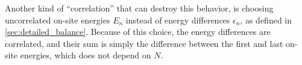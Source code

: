 Another kind of ``correlation'' that can destroy this behavior, is
choosing uncorrelated on-site energies $E_n$ instead of energy differences $\epsilon_n$,
as defined in \autoref{sec:detailed_balance}. 
Because of this choice, the energy differences are correlated, and their
sum is simply the difference between the first and last on-site energies,
which does not depend on $N$.


